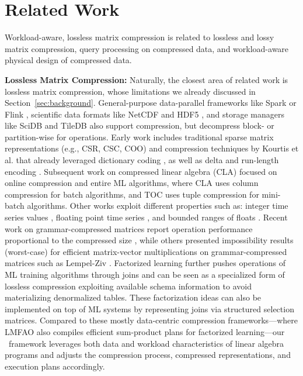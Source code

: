 \section{Related Work}
\label{sec:related}

Workload-aware, lossless matrix compression is related to lossless and lossy matrix compression,
query processing on compressed data, and workload-aware physical design of compressed data.

\textbf{Lossless Matrix Compression:}
Naturally, the closest area of related work is lossless matrix compression, whose limitations we already discussed in Section~\ref{sec:background}. General-purpose data-parallel frameworks like Spark \cite{ZahariaCDDMMFSS12} or Flink \cite{AlexandrovBEFHHKLLMNPRSSHTW14}, scientific data formats like NetCDF and HDF5 \cite{hdf5}, and storage managers like SciDB \cite{StonebrakerBPR11} and TileDB \cite{PapadopoulosDMM16} also support compression, but decompress block- or partition-wise for operations. Early work includes traditional sparse matrix representations (e.g., CSR, CSC, COO) \cite{Saad94sparskit} and compression techniques by Kourtis et al. that already leveraged dictionary coding \cite{KourtisGK08, KarakasisGKGK13}, as well as delta and run-length encoding \cite{KarakasisGKGK13}.
Subsequent work on compressed linear algebra (CLA) focused on online compression and entire ML algorithms, where CLA \cite{ElgoharyBHRR16,ElgoharyBHRR18} uses column compression for batch algorithms, and TOC \cite{LiCZ00NP19} uses tuple compression for mini-batch algorithms.
Other works exploit different properties such as: integer time series values \cite{BlalockMG18}, floating point time series \cite{LiakosPK22}, and bounded ranges of floats \cite{LiuJPE21}.
Recent work on grammar-compressed matrices report operation performance proportional to the compressed size \cite{abs-2203-14540}, while others presented impossibility results (worst-case) for efficient matrix-vector multiplications on grammar-compressed matrices such as Lempel-Ziv \cite{AbboudBBK20}.
Factorized learning \cite{KumarNP15,SchleichOC16} further pushes operations of ML training algorithms through joins and can be seen as a specialized form of lossless compression exploiting available schema information \cite{Olteanu20} to avoid materializing denormalized tables. These factorization ideas can also be implemented on top of ML systems \cite{ChenKNP17} by representing joins via structured selection matrices. Compared to these mostly data-centric compression frameworks---where LMFAO \cite{SchleichOK0N19} also compiles efficient sum-product plans for factorized learning---our \name\ framework leverages both data and workload characteristics of linear algebra programs and adjusts the compression process, compressed representations, and execution plans accordingly.

